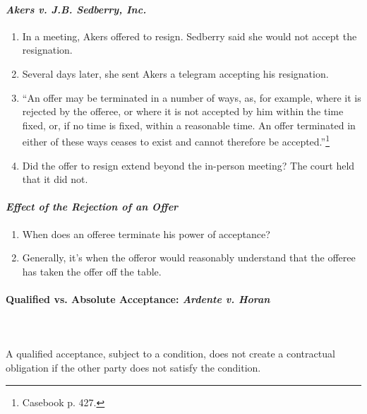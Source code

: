 \paragraph{\emph{Akers v. J.B. Sedberry, Inc.}}

\begin{enumerate}
    \item In a meeting, Akers offered to resign. Sedberry said she would not 
    accept the resignation.
    \item Several days later, she sent Akers a telegram accepting his 
    resignation.
    \item ``An offer may be terminated in a number of ways, as, for example, 
    where it is rejected by the offeree, or where it is not accepted by him 
    within the time fixed, or, if no time is fixed, within a reasonable time. 
    An offer terminated in either of these ways ceases to exist and cannot 
    therefore be accepted.''\footnote{Casebook p. 427.}
    \item Did the offer to resign extend beyond the in-person meeting? The 
    court held that it did not.
\end{enumerate}

\paragraph{\emph{Effect of the Rejection of an Offer}}

\begin{enumerate}
    \item When does an offeree terminate his power of acceptance?
    \item Generally, it's when the offeror would reasonably understand that 
    the offeree has taken the offer off the table.
\end{enumerate}

\paragraph{Qualified vs. Absolute Acceptance: \emph{Ardente v. Horan}}
~\\\\
A qualified acceptance, subject to a condition, does not create a contractual 
obligation if the other party does not satisfy the condition.

